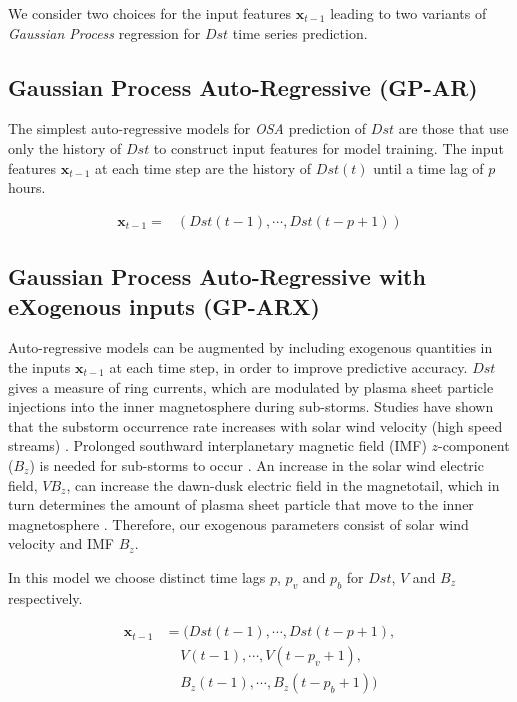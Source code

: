 \documentclass[sw, draft]{AGUTeX}
\begin{document}
\begin{article}
We consider two choices for the input features $\mathbf{x}_{t-1}$ leading to two variants of \emph{Gaussian Process} regression for $Dst$ time series prediction.

\subsection{Gaussian Process Auto-Regressive (GP-AR)} \label{sec:gpar}

The simplest auto-regressive models for \emph{OSA} prediction of $Dst$ are those that use only the history of $Dst$ to construct input features for model training. The input features $\mathbf{x}_{t-1}$ at each time step are the history of $Dst(t)$ until a time lag of $p$ hours.

\begin{align*}
    \mathbf{x}_{t-1} = & \left(Dst(t-1), \cdots , Dst(t-p+1)\right)
\end{align*}

\subsection{Gaussian Process Auto-Regressive with eXogenous inputs (GP-ARX)} \label{sec:gparx}

Auto-regressive models can be augmented by including exogenous quantities in the inputs $\mathbf{x}_{t-1}$ at each time step, in order to improve predictive accuracy. $Dst$ gives a measure of ring currents, which are modulated by plasma sheet particle injections into the inner magnetosphere during sub-storms. Studies have shown that the substorm occurrence rate increases with solar wind velocity (high speed streams) \citet{Kissinger2011,Newell2016}. Prolonged southward interplanetary magnetic field (IMF) $z$-component ($B_z$) is needed for sub-storms to occur \citet{McPherron1986}. An increase in the solar wind electric field, $VB_z$, can increase the dawn-dusk electric field in the magnetotail, which in turn determines the amount of plasma sheet particle that move to the inner magnetosphere \citet{Friedel2001}. Therefore, our exogenous parameters consist of solar wind velocity and IMF $B_z$.   

In this model we choose distinct time lags $p$, $p_{v}$ and $p_{b}$ for $Dst$, $V$ and $B_z$ respectively.
    
\begin{align*}
       \mathbf{x}_{t-1} & = (Dst(t-1), \cdots , Dst(t-p+1), \\
        & \ \ \ \ \  V(t-1), \cdots, V(t-p_{v}+1),\\
        & \ \ \ \ \  B_{z}(t-1), \cdots, B_{z}(t-p_{b}+1))
\end{align*}


\end{article}
\end{document}
